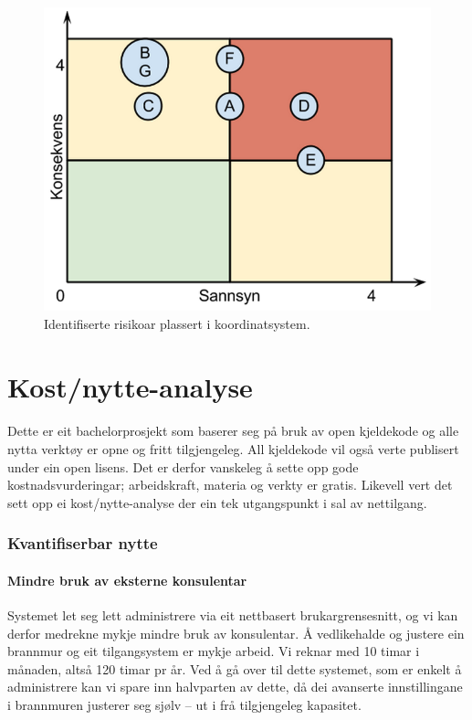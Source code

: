 \documentclass[nynorsk,12pt,a4paper]{article}
\begin{document}
\begin{figure}[h!]
	\centering
	\includegraphics[scale=0.55]{./vdok-img/ros_v2.png}
	\caption{Identifiserte risikoar plassert i koordinatsystem.}
\end{figure}

\newpage
\section{Kost/nytte-analyse}
\paragraph{}
Dette er eit bachelorprosjekt som baserer seg på bruk av open kjeldekode og alle nytta verktøy er opne og fritt tilgjengeleg. All kjeldekode vil også verte publisert under ein open lisens. Det er derfor vanskeleg å sette opp gode kostnadsvurderingar; arbeidskraft, materia og verkty er gratis. Likevell vert det sett opp ei kost/nytte-analyse der ein tek utgangspunkt i sal av nettilgang. 

\subsubsection{Kvantifiserbar nytte}
\paragraph{Mindre bruk av eksterne konsulentar}
Systemet let seg lett administrere via eit nettbasert brukargrensesnitt, og vi kan derfor medrekne mykje mindre bruk av konsulentar. Å vedlikehalde og justere ein brannmur og eit tilgangsystem er mykje arbeid. Vi reknar med 10 timar i månaden, altså 120 timar pr år. Ved å gå over til dette systemet, som er enkelt å administrere kan vi spare inn halvparten av dette, då dei avanserte innstillingane i brannmuren justerer seg sjølv -- ut i frå tilgjengeleg kapasitet. 
\end{document}
